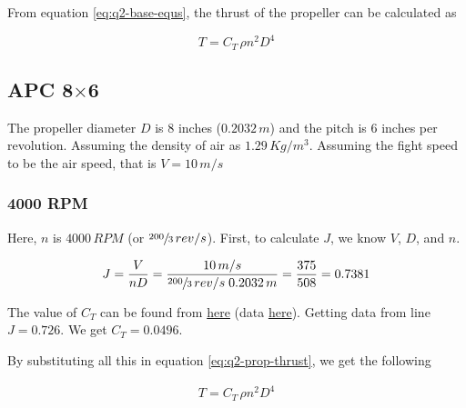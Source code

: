 From equation \ref{eq:q2-base-equs}, the thrust of the propeller can be calculated as

\begin{equation}
    T = C_T \, \rho n^2 D^4
    \label{eq:q2-prop-thrust}
\end{equation}

\subsection{APC 8\texorpdfstring{$\times$}{by}6}

The propeller diameter $D$ is $8$ inches ($0.2032\,m$) and the pitch is $6$ inches per revolution. Assuming the density of air as $1.29\,Kg/m^3$.
Assuming the fight speed to be the air speed, that is $V = 10\,m/s$

\subsubsection*{4000 RPM}

Here, $n$ is $4000\,RPM$ (or $\sfrac{200}{3}\,rev/s$). First, to calculate $J$, we know $V$, $D$, and $n$.

\begin{equation*}
    J = \frac{V}{nD} = \frac{10\,m/s}{\sfrac{200}{3}\,rev/s \; 0.2032\,m} = \frac{375}{508} = 0.7381
\end{equation*}

The value of $C_T$ can be found from \href{https://m-selig.ae.illinois.edu/props/volume-1/plots/apcsf_8x6_ct.png}{here} (data \href{https://m-selig.ae.illinois.edu/props/volume-1/data/apcsf_8x6_2784rd_4010.txt}{here}). Getting data from line $J = 0.726$. We get $C_T = 0.0496$.

By substituting all this in equation \ref{eq:q2-prop-thrust}, we get the following

\begin{align*}
    T = C_T \, \rho n^2 D^4
\end{align*}
